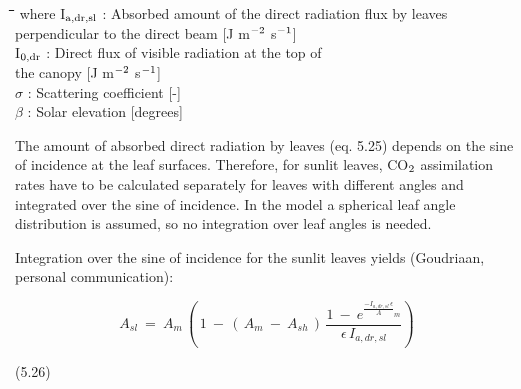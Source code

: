 \nwln
\begin{tabbing}
\hspace{1.27cm}\=\hspace{1.27cm}\=\hspace{1.27cm}\=\hspace{1.27cm}\=%
\hspace{1.27cm}\=\hspace{1.27cm}\=\hspace{1.27cm}\=\hspace{1.27cm}\=%
\hspace{1.27cm}\=\hspace{1.27cm}\=\kill
where I$_{{\rm a,dr,sl}}$ : Absorbed amount of the direct radiation flux by leaves\\
   perpendicular to the direct beam        [J m$^{{\rm -2}}$ s$^{{\rm -1}}$]\\
I$_{{\rm 0,dr}}$ : Direct flux of visible radiation at the top of \\
                  the canopy          [J m$^{{\rm -2}}$ s$^{{\rm -1}}$]\\
$\sigma$ : Scattering coefficient        [-]\\
$\beta$ : Solar elevation        [degrees]
\end{tabbing}



The amount of absorbed direct radiation by leaves (eq. 5.25) depends on the sine of
incidence at the leaf surfaces. Therefore, for sunlit leaves, CO$_{{\rm 2}}$ assimilation rates have to
be calculated separately for leaves with different angles and integrated over the sine of
incidence. In the model a spherical leaf angle distribution is assumed, so no integration
over leaf angles is needed.



Integration over the sine of incidence for the sunlit leaves yields (Goudriaan, personal
communication):

\begin{displaymath}
A _{sl} ~=~ A _{m} \, (\, 1~-\, (\, A _{m} ~-~A _{sh} \, )\, {{\frac{ 1~-~e ^{{\frac{{{-I _{a,dr,sl} \, \epsilon }}}{A}} _{m} } }{\epsilon\, I _{a,dr,sl} }} })
\end{displaymath}


\strut\hfill (5.26)

